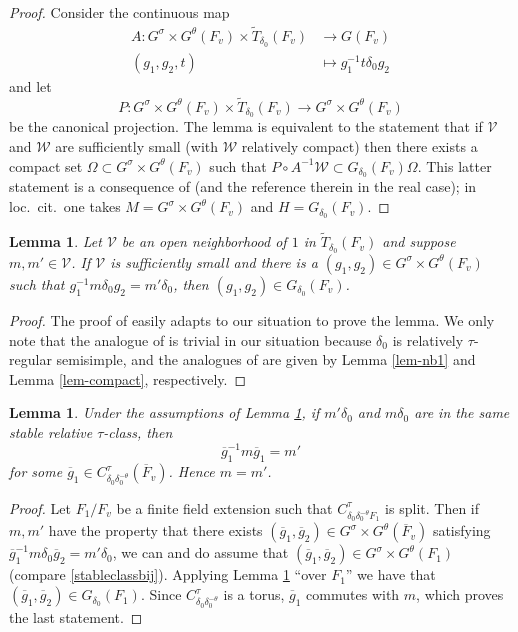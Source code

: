 \documentclass[12pt]{amsart}
\newtheorem{lem}[thm]{Lemma}
\theoremstyle{remark}
\numberwithin{equation}{section}
\newcommand{\lto}{\longrightarrow}
\theoremstyle{definition}
\renewcommand{\bar}{\overline}
\numberwithin{equation}{subsection}
\begin{document}
\begin{proof} Consider the continuous map
\begin{align*}
A:G^{\sigma} \times G^{\theta}(F_v) \times \widetilde{T}_{\delta_0}(F_v)
&\lto G(F_v)\\
(g_1,g_2,t) &\longmapsto g_1^{-1}t\delta_0g_2
\end{align*}
and let
$$
P:G^{\sigma} \times G^{\theta}(F_v) \times \widetilde{T}_{\delta_0}(F_v)
\lto G^{\sigma} \times G^{\theta}(F_v)
$$
be the canonical projection.  The lemma is equivalent to the statement that if $\mathcal{V}$
and $\mathcal{W}$ are sufficiently small (with $\mathcal{W}$ relatively compact)
then there exists a compact set
$\Omega \subset G^{\sigma} \times G^{\theta}(F_v)$ such that $P \circ
A^{-1}\mathcal{W} \subset G_{\delta_0}(F_v) \Omega$.  This latter
statement is a consequence of \cite[Proposition 2.5]{RadRal} (and the reference therein in the real case); in loc.~cit.~one takes $M=G^{\sigma} \times
G^{\theta}(F_v)$ and $H=G_{\delta_0}(F_v)$.
\end{proof}

\begin{lem} \label{lem-314}Let $\mathcal{V}$ be an open neighborhood of $1$ in
$\widetilde{T}_{\delta_0}(F_v)$ and suppose $m,m' \in \mathcal{V}$.  If
$\mathcal{V}$ is sufficiently small and there is a $(g_1,g_2) \in
G^{\sigma} \times G^{\theta}(F_v)$ such that $g_1^{-1} m\delta_0
g_2=m'\delta_0$, then $(g_1,g_2) \in G_{\delta_0}(F_v)$.
\end{lem}

\begin{proof}
The proof of  \cite[Lemme 3.1.4]{Lab} easily adapts to our situation to prove the lemma.
We only note that the analogue of \cite[Lemme 3.1.2]{Lab} is trivial in our situation because
$\delta_0$ is relatively $\tau$-regular semisimple, and the analogues of \cite[Lemme 3.1.1 and Lemme 3.1.3]{Lab}
 are given by Lemma \ref{lem-nb1} and Lemma \ref{lem-compact}, respectively.
\end{proof}

\begin{lem} \label{lem-stable}
Under the assumptions of Lemma \ref{lem-314}, if $m'\delta_0$ and $m\delta_0$ are
in the same stable relative $\tau$-class, then
$$
\bar{g}_1^{-1}m\bar{g}_1=m'
$$
for some $\bar{g}_1\in C_{\delta_0\delta_0^{-\theta}}^{\tau}(\bar{F}_v)$.  Hence $m=m'$.
\end{lem}

\begin{proof}
Let $F_1/F_v$ be a finite field extension such that $C_{\delta_0\delta_0^{-\theta}F_1}^{\tau}$ is split.  Then if $m,m'$ have the property that there exists
$(\bar{g}_1,\bar{g}_2) \in G^{\sigma} \times G^{\theta}(\bar{F}_v)$
satisfying
 $\bar{g}_1^{-1}m\delta_0\bar{g}_2=m'\delta_0$,
we can and do assume that $(\bar{g}_1,\bar{g}_2) \in G^{\sigma} \times G^{\theta}(F_1)$ (compare \eqref{stableclassbij}).
Applying Lemma \ref{lem-314} ``over $F_1$'' we have that
$(\bar{g}_1,\bar{g}_2) \in
G_{\delta_0}(F_1)$.  Since $C_{\delta_0\delta_0^{-\theta}}^{\tau}$ is a torus, $\bar{g}_1$ commutes with $m$, which proves the last statement.
\end{proof}
\end{document}

